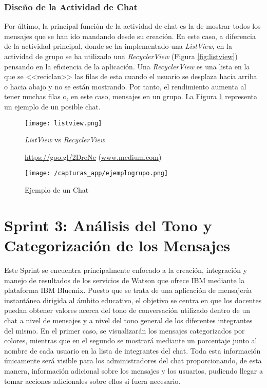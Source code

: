 \subsubsection{Diseño de la Actividad de Chat}
Por último, la principal función de la actividad de chat es la de mostrar todos los mensajes que se han ido mandando desde su creación. En este caso, a diferencia de la actividad principal, donde se ha implementado una \textit{ListView}, en la actividad de grupo se ha utilizado una \textit{RecyclerView} (Figura \ref{fig:listview}) pensando en la eficiencia de la aplicación. Una \textit{RecyclerView} es una lista en la que se <<reciclan>> las filas de esta cuando el usuario se desplaza hacia arriba o hacia abajo y no se están mostrando. Por tanto, el rendimiento aumenta al tener muchas filas o, en este caso, mensajes en un grupo. La Figura \ref{fig:ejemplogrupo} representa un ejemplo de un posible chat.

\begin{figure}[!h]
	\centering
	\begin{minipage}{.5\textwidth}
		\centering
		\texttt{[image: listview.png]}
		\caption{\textit{ListView} vs \textit{RecyclerView}}
		\label{fig:listview}{\url{https://goo.gl/2DreNc} (\url{www.medium.com})}
	\end{minipage}%
	\begin{minipage}{.5\textwidth}
		\centering
		\texttt{[image: /capturas\_app/ejemplogrupo.png]}
		\caption{Ejemplo de un Chat}
		\label{fig:ejemplogrupo}
	\end{minipage}
\end{figure}

\clearpage

\section{Sprint 3: Análisis del Tono y Categorización de los Mensajes}
Este Sprint se encuentra principalmente enfocado a la creación, integración y manejo de resultados de los servicios de Watson que ofrece IBM mediante la plataforma IBM Bluemix. Puesto que se trata de una aplicación de mensajería instantánea dirigida al ámbito educativo, el objetivo se centra en que los docentes puedan obtener valores acerca del tono de conversación utilizado dentro de un chat a nivel de mensajes y a nivel del tono general de los diferentes integrantes del mismo. En el primer caso, se visualizarán los mensajes categorizados por colores, mientras que en el segundo se mostrará mediante un porcentaje junto al nombre de cada usuario en la lista de integrantes del chat. Toda esta información únicamente será visible para los administradores del chat proporcionando, de esta manera, información adicional sobre los mensajes y los usuarios, pudiendo llegar a tomar acciones adicionales sobre ellos si fuera necesario.


